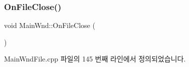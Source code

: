 \mbox{\label{class_main_wnd_abf162c1763ea3246bdac171847fb2d9d}} 
\subsubsection{\texorpdfstring{On\+File\+Close()}{OnFileClose()}}
{\footnotesize\ttfamily void Main\+Wnd\+::\+On\+File\+Close (\begin{DoxyParamCaption}{ }\end{DoxyParamCaption})\hspace{0.3cm}{\ttfamily [protected]}}



Main\+Wnd\+File.\+cpp 파일의 145 번째 라인에서 정의되었습니다.


